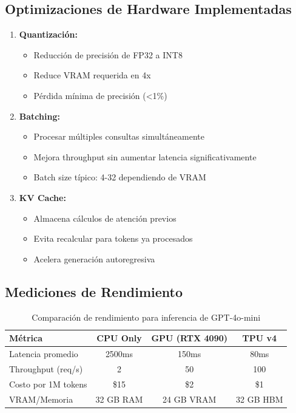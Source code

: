 \documentclass[12pt,a4paper]{article}
\begin{document}
\subsection{Optimizaciones de Hardware Implementadas}

\begin{enumerate}
    \item \textbf{Quantización:}
    \begin{itemize}
        \item Reducción de precisión de FP32 a INT8
        \item Reduce VRAM requerida en 4x
        \item Pérdida mínima de precisión (<1\%)
    \end{itemize}

    \item \textbf{Batching:}
    \begin{itemize}
        \item Procesar múltiples consultas simultáneamente
        \item Mejora throughput sin aumentar latencia significativamente
        \item Batch size típico: 4-32 dependiendo de VRAM
    \end{itemize}

    \item \textbf{KV Cache:}
    \begin{itemize}
        \item Almacena cálculos de atención previos
        \item Evita recalcular para tokens ya procesados
        \item Acelera generación autoregresiva
    \end{itemize}
\end{enumerate}

\subsection{Mediciones de Rendimiento}

\begin{table}[H]
\centering
\begin{tabular}{|l|c|c|c|}
\hline
\textbf{Métrica} & \textbf{CPU Only} & \textbf{GPU (RTX 4090)} & \textbf{TPU v4} \\
\hline
Latencia promedio & 2500ms & 150ms & 80ms \\
Throughput (req/s) & 2 & 50 & 100 \\
Costo por 1M tokens & \$15 & \$2 & \$1 \\
VRAM/Memoria & 32 GB RAM & 24 GB VRAM & 32 GB HBM \\
\hline
\end{tabular}
\caption{Comparación de rendimiento para inferencia de GPT-4o-mini}
\end{table}
\end{document}

